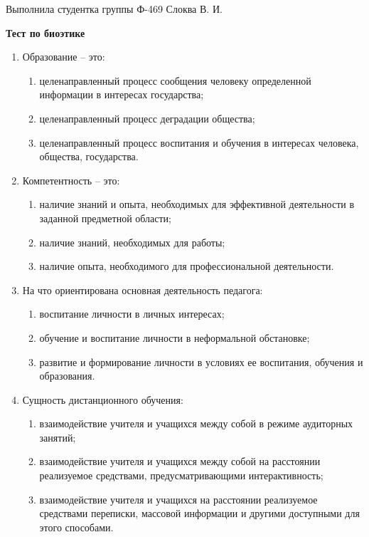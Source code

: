 \documentclass[12pt,pscyr]{hedwork}
\renewcommand{\labelenumii}{\asbuk{enumii})}
\newcommand{\itempo}{\stepcounter{enumii}\item[\bfseries\labelenumii]}
\begin{document}
  
  \begin{flushright}
    Выполнила студентка группы Ф-469 Слоква В. И.
  \end{flushright}
  \vspace{-2em}
  \begin{center}
    \bfseries Тест по биоэтике
  \end{center}

  \begin{enumerate}
    \item Образование -- это:
      \begin{enumerate}
        \item целенаправленный процесс сообщения человеку определенной
          информации в интересах государства;
        \item целенаправленный процесс деградации общества;
        \itempo целенаправленный процесс воспитания и обучения в интересах
          человека, общества, государства.
      \end{enumerate}

    \item Компетентность -- это:
      \begin{enumerate}
        \itempo наличие знаний и опыта, необходимых для эффективной деятельности
          в заданной предметной области;
        \item наличие знаний, необходимых для работы;
        \item наличие опыта, необходимого для профессиональной деятельности.
      \end{enumerate}

    \item На что ориентирована основная деятельность педагога:
      \begin{enumerate}
        \item воспитание личности в личных интересах;
        \item обучение и воспитание личности в неформальной обстановке;
        \itempo развитие и формирование личности в условиях ее воспитания,
          обучения и образования.
      \end{enumerate}

    \item Сущность дистанционного обучения:
      \begin{enumerate}
        \item взаимодействие учителя и учащихся между собой в режиме аудиторных
          занятий;
        \itempo взаимодействие учителя и учащихся между собой на расстоянии
          реализуемое средствами, предусматривающими интерактивность;
        \item взаимодействие учителя и учащихся на расстоянии реализуемое
          средствами переписки, массовой информации и другими доступными для
          этого способами.
      \end{enumerate}
 

\end{enumerate}
\end{document}
